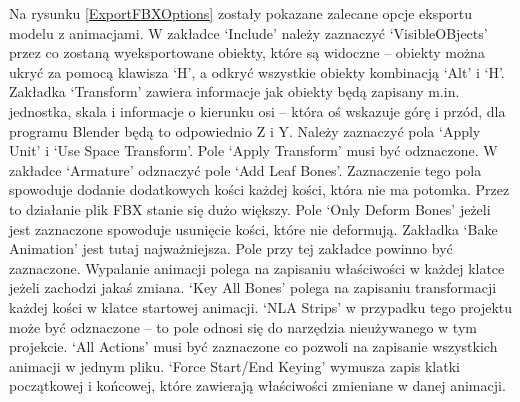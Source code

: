 \documentclass[12pt,twoside]{article}
\begin{document}
Na rysunku \ref{ExportFBXOptions} zostały pokazane zalecane opcje eksportu
modelu z animacjami. W zakładce `Include' należy zaznaczyć `VisibleOBjects'
przez co zostaną wyeksportowane obiekty, które są widoczne -- obiekty można ukryć
za pomocą klawisza `H', a odkryć wszystkie obiekty kombinacją `Alt' i `H'.
Zakładka `Transform' zawiera informacje jak obiekty będą zapisany m.in.
jednostka, skala i informacje o kierunku osi -- która oś wskazuje górę i przód,
dla programu Blender będą to odpowiednio Z i Y. Należy zaznaczyć pola `Apply
Unit' i `Use Space Transform'. Pole `Apply Transform' musi być odznaczone. W
zakładce `Armature' odznaczyć pole `Add Leaf Bones'. Zaznaczenie tego pola
spowoduje dodanie dodatkowych kości każdej kości, która nie ma potomka. Przez to
działanie plik FBX stanie się dużo większy. Pole `Only Deform Bones' jeżeli jest
zaznaczone spowoduje usunięcie kości, które nie deformują. Zakładka `Bake
Animation' jest tutaj najważniejsza. Pole przy tej zakładce powinno być
zaznaczone. Wypalanie animacji polega na zapisaniu właściwości w każdej klatce
jeżeli zachodzi jakaś zmiana. `Key All Bones' polega na zapisaniu transformacji
każdej kości w klatce startowej animacji. `NLA Strips' w przypadku tego projektu
może być odznaczone -- to pole odnosi się do narzędzia nieużywanego w tym
projekcie. `All Actions' musi być zaznaczone co pozwoli na zapisanie wszystkich
animacji w jednym pliku. `Force Start/End Keying' wymusza zapis klatki
początkowej i końcowej, które zawierają właściwości zmieniane w danej animacji.
\end{document}
